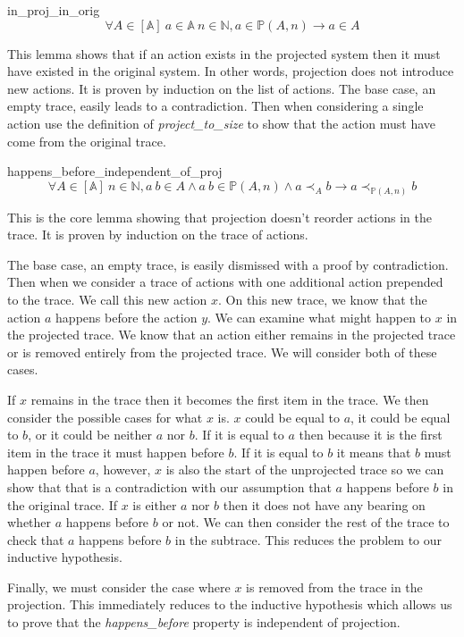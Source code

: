\documentclass[runningheads]{llncs}
\newcommand{\action}{\mathds{A}}
\newcommand{\listaction}{[\action]}
\newcommand{\happensbefore}{\prec_A}
\newcommand{\projectsize}[2]{\mathds{P}(#1, #2)}
\begin{document}
\begin{lemma}{in\_proj\_in\_orig}
$$ \forall A \in \listaction\ a \in \action\ n \in \mathds{N}, a \in \projectsize{A}{n} \longrightarrow  a \in A $$
\end{lemma}
This lemma shows that if an action exists in the projected system then it must have existed in the original system. In other words, projection does not introduce new actions.
 It is proven by induction on the list of actions. The base case, an empty trace, easily leads to a contradiction. Then when considering a single action use the definition of \emph{project\_to\_size} to show that the action must have come from the original trace. 

\begin{lemma}{happens\_before\_independent\_of\_proj}
$$ \forall A \in \listaction\ n \in \mathds{N},
a\ b \in A \wedge a\ b \in \projectsize{A}{n} \wedge a \happensbefore b \longrightarrow a \prec_{\projectsize{A}{n}} b
$$
\end{lemma}
This is the core lemma showing that projection doesn't reorder actions in the trace. It is proven by induction on the trace of actions. 

The base case, an empty trace, is easily dismissed with a proof by contradiction. 
Then when we consider a trace of actions with one additional action prepended to the trace. We call this new action $x$. On this new trace, we know that the action $a$ happens before the action $y$.
We can examine what might happen to $x$ in the projected trace.
We know that an action either remains in the projected trace or is removed entirely from the projected trace.
We will consider both of these cases.

If $x$ remains in the trace then it becomes the first item in the trace. 
We then consider the possible cases for what $x$ is.
$x$ could be equal to $a$, it could be equal to $b$, or it could be neither $a$ nor $b$.
If it is equal to $a$ then because it is the first item in the trace it must happen before $b$.
If it is equal to $b$ it means that $b$ must happen before $a$, however, $x$ is also the start of the unprojected trace so we can show that that is a contradiction with our assumption that $a$ happens before $b$ in the original trace.
If $x$ is either $a$ nor $b$ then it does not have any bearing on whether $a$ happens before $b$ or not. We can then consider the rest of the trace to check that $a$ happens before $b$ in the subtrace. This reduces the problem to our inductive hypothesis.

Finally, we must consider the case where $x$ is removed from the trace in the projection. This immediately reduces to the inductive hypothesis which allows us to prove that the \emph{happens\_before} property is independent of projection.
\end{document}
